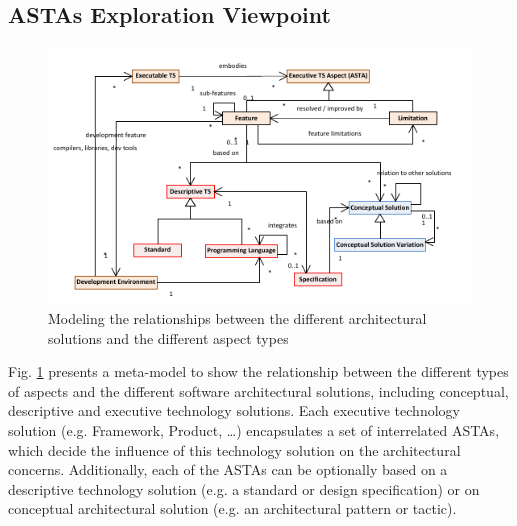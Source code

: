 \documentclass[conference]{IEEEtran}
\begin{document}
\subsection{ASTAs Exploration Viewpoint}
\begin{figure}[b]
	\centering
		\includegraphics[scale=1.0]{SolutionsFeatuersRelationsModel.pdf}
	\caption{Modeling the relationships between the different architectural
	solutions and the different aspect types}
	\label{fig:SolutionAspectsRelations}
\end{figure}
Fig. \ref{fig:SolutionAspectsRelations} presents a meta-model to show the
relationship between the different types of aspects and the different software
architectural solutions, including conceptual, descriptive and executive
technology solutions. Each executive technology solution (e.g. Framework,
Product, \ldots) encapsulates a set of interrelated ASTAs, which decide the
influence of this technology solution on the architectural concerns.
Additionally, each of the ASTAs can be optionally based on a descriptive
technology solution (e.g. a standard or design specification) or on conceptual
architectural solution (e.g. an architectural pattern or tactic).
\end{document}
